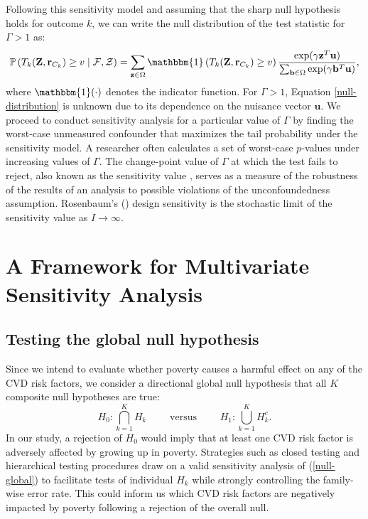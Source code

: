 \documentclass[12pt,leqno,titlepage]{amsart}
\renewcommand{\P}{\mathbb{P}}
\newcommand{\1}{\mathbbm{1}}
\begin{document}
\begin{bibunit}
Following this sensitivity model and assuming that the sharp null hypothesis holds for outcome $k$, we can write the null distribution of the test statistic for $\Gamma > 1$ as:
\begin{equation} \label{null-distribution}
\P\left(T_k(\mathbf{Z},\mathbf{r}_{C_{k}}) \ge v \mid \mathcal{F}, \mathcal{Z} \right) = \sum_{\mathbf{z} \in \Omega} \1\left(T_k(\mathbf{Z}, \mathbf{r}_{C_{k}}) \geq v\right) \frac{ \exp(\gamma \mathbf{z}^T \mathbf{u})}{\sum_{\mathbf{b} \in \Omega} \exp(\gamma \mathbf{b}^T \mathbf{u})},
\end{equation}
where $\1(\cdot)$ denotes the indicator function. For $\Gamma > 1$, Equation \ref{null-distribution} is unknown due to its dependence on the nuisance vector $\mathbf{u}$. We proceed to conduct sensitivity analysis for a particular value of $\Gamma$ by finding the worst-case unmeasured confounder that maximizes the tail probability under the sensitivity model. 
A researcher often calculates a set of worst-case $p$-values under increasing values of $\Gamma$. The change-point value of $\Gamma$ at which the test fails to reject, also known as the sensitivity value \citep{zhao2019sensitivityval}, serves as a measure of the robustness of the results of an analysis to possible violations of the unconfoundedness assumption. Rosenbaum's (\citeyear{rosenbaum2004design}) design sensitivity is the stochastic limit of the sensitivity value as $I\rightarrow \infty$.


\section{A Framework for Multivariate Sensitivity Analysis} \label{sec: methods}

\subsection{Testing the global null hypothesis}

Since we intend to evaluate whether poverty causes a harmful effect on any of the CVD risk factors, we consider a directional global null hypothesis that all $K$ composite null hypotheses are true:
\begin{equation} \label{null-global}
    H_0: \bigcap_{k=1}^K H_k \qquad \text{ versus } \qquad H_1: \bigcup_{k=1}^K H^c_k.
\end{equation}
In our study, a rejection of $H_0$ would imply that at least one CVD risk factor is adversely affected by growing up in poverty.
Strategies such as closed testing and hierarchical testing procedures draw on a valid sensitivity analysis of (\ref{null-global}) to facilitate tests of individual $H_k$ while strongly controlling the family-wise error rate. This could inform us which CVD risk factors are negatively impacted by poverty following a rejection of the overall null.



\end{bibunit}
\end{document}
